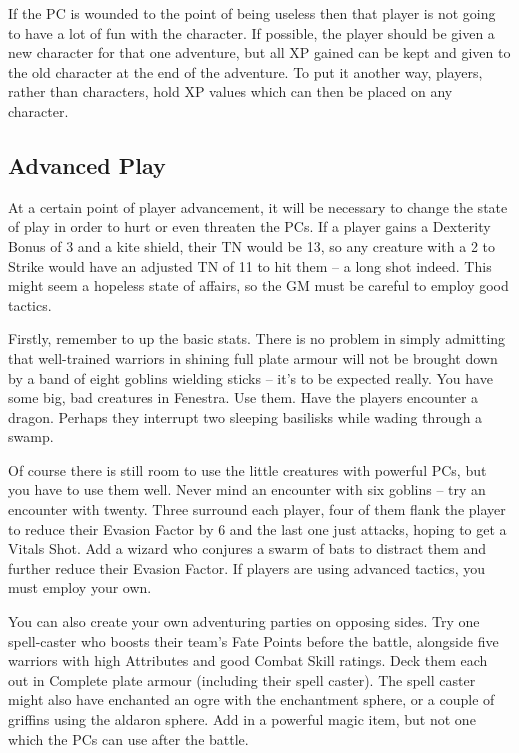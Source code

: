 If the PC is wounded to the point of being useless then that player is not going to have a lot of fun with the character. If possible, the player should be given a new character for that one adventure, but all XP gained can be kept and given to the old character at the end of the adventure.
To put it another way, players, rather than characters, hold XP values which can then be placed on any character.

\subsection{Advanced Play}

At a certain point of player advancement, it will be necessary to change the state of play in order to hurt or even threaten the PCs.  If a player gains a Dexterity Bonus of 3 and a kite shield, their TN would be 13, so any creature with a 2 to Strike would have an adjusted TN of 11 to hit them -- a long shot indeed.  This might seem a hopeless state of affairs, so the GM must be careful to employ good tactics.

Firstly, remember to up the basic stats.  There is no problem in simply admitting that well-trained warriors in shining full plate armour will not be brought down by a band of eight goblins wielding sticks -- it's to be expected really.  You have some big, bad creatures in Fenestra.  Use them.  Have the players encounter a dragon.  Perhaps they interrupt two sleeping basilisks while wading through a swamp.

Of course there is still room to use the little creatures with powerful PCs, but you have to use them well.  Never mind an encounter with six goblins -- try an encounter with twenty.  Three surround each player, four of them flank the player to reduce their Evasion Factor by 6 and the last one just attacks, hoping to get a Vitals Shot.  Add a wizard who conjures a swarm of bats to distract them and further reduce their Evasion Factor.  If players are using advanced tactics, you must employ your own.

You can also create your own adventuring parties on opposing sides.  Try one spell-caster who boosts their team's Fate Points before the battle, alongside five warriors with high Attributes and good Combat Skill ratings.  Deck them each out in Complete plate armour (including their spell caster).  The spell caster might also have enchanted an ogre with the enchantment sphere, or a couple  of griffins using the aldaron sphere.  Add in a powerful magic item, but not one which the PCs can use after the battle.

